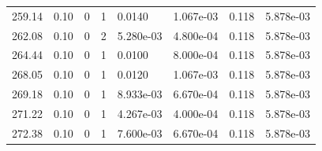 \documentclass[preview]{standalone}
\begin{document}
{{{{\begin{tabular}{L{1.2cm}C{1.2cm} C{0.3cm}C{0.5cm} C{1.4cm}C{1.4cm} C{1.4cm}C{1.4cm}}
  259.14  &  0.10  & 0     &  1 &  0.0140  & 1.067e-03  & 0.118 &  5.878e-03   \\ 
  262.08  &  0.10  & 0     &  2 &  5.280e-03  & 4.800e-04  & 0.118 &  5.878e-03   \\ 
  264.44  &  0.10  & 0     &  1 &  0.0100  & 8.000e-04  & 0.118 &  5.878e-03   \\ 
  268.05  &  0.10  & 0     &  1 &  0.0120  & 1.067e-03  & 0.118 &  5.878e-03   \\ 
  269.18  &  0.10  & 0     &  1 &  8.933e-03  & 6.670e-04  & 0.118 &  5.878e-03   \\ 
  271.22  &  0.10  & 0     &  1 &  4.267e-03  & 4.000e-04  & 0.118 &  5.878e-03   \\ 
  272.38  &  0.10  & 0     &  1 &  7.600e-03  & 6.670e-04  & 0.118 &  5.878e-03   \\ 
\hline 
\end{tabular} 

}}}}
\end{document}
